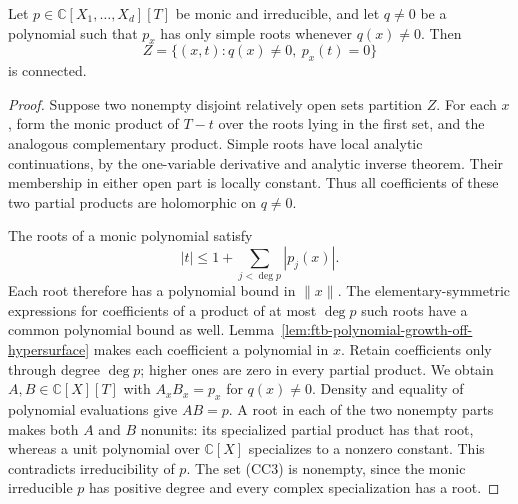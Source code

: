 \begin{srlemma}
\label{lem:ftb-connected-unramified-root-cover}
Let \(p\in\mathbb C[X_1,\ldots,X_d][T]\) be monic and
irreducible, and let \(q\ne0\) be a polynomial such that
\(p_x\) has only simple roots whenever \(q(x)\ne0\).
Then
\[
                   Z=\{(x,t):q(x)\ne0,\ p_x(t)=0\}
                                                               \tag{CC3}
\]
is connected.
\end{srlemma}
\begin{proof}
Suppose two nonempty disjoint relatively open sets partition \(Z\).
For each \(x\), form the monic product of \(T-t\) over the
roots lying in the first set, and the analogous complementary
product.
Simple roots have local analytic continuations, by the
one-variable derivative and analytic inverse theorem.
Their membership in either open part is locally constant.
Thus all coefficients of these two partial products are
holomorphic on \(q\ne0\).

The roots of a monic polynomial satisfy
\[
                   |t|\le 1+\sum_{j<\deg p}|p_j(x)|.
\]
Each root therefore has a polynomial bound in \(\|x\|\).
The elementary-symmetric expressions for coefficients of
a product of at most \(\deg p\) such roots have a common
polynomial bound as well.
Lemma~\ref{lem:ftb-polynomial-growth-off-hypersurface}
makes each coefficient a polynomial in \(x\).
Retain coefficients only through degree \(\deg p\); higher
ones are zero in every partial product.
We obtain \(A,B\in\mathbb C[X][T]\) with
\(A_xB_x=p_x\) for \(q(x)\ne0\).
Density and equality of polynomial evaluations give \(AB=p\).
A root in each of the two nonempty parts makes both \(A\)
and \(B\) nonunits: its specialized partial product has that root,
whereas a unit polynomial over \(\mathbb C[X]\) specializes to
a nonzero constant.
This contradicts irreducibility of \(p\).
The set (CC3) is nonempty, since the monic irreducible \(p\)
has positive degree and every complex specialization has a root.
\end{proof}

